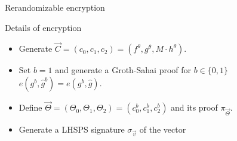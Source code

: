 \begin{frame}{Rerandomizable encryption}

  \begin{block}{Details of encryption}
    \begin{itemize}
    \item Generate $\vec{C} = (c_0, c_1, c_2) = (f^{\theta},  g^{\theta}, M \cdot h^{\theta})$.
    \item Set $b = 1$ and generate a Groth-Sahai proof for $b \in \{0,1\}$ $e(g^b, \hat{g}^b) = e(g^b, \hat{g})$.
    \item Define $\vec{\Theta} = (\Theta_0, \Theta_1, \Theta_2) = (c_0^b, c_1^b, c_2^b)$ and its proof $\pi_{\vec{\Theta}}$.
    \item Generate a LHSPS signature $\sigma_{\vec{v}}$ of the vector
      

\end{itemize}
\end{block}
\end{frame}
